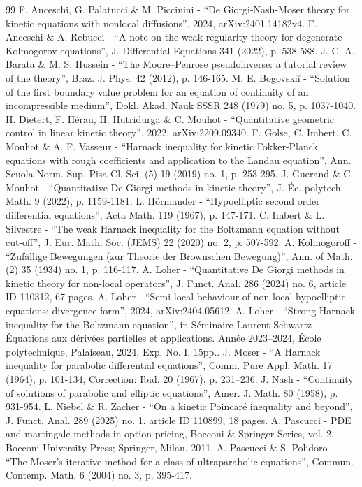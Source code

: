 \documentclass[10pt]{amsart}
\theoremstyle{definition}
\begin{document}
\begin{thebibliography}{99}
 F. Anceschi, G. Palatucci \& M. Piccinini - “De Giorgi-Nash-Moser theory for kinetic equations with nonlocal diffusions”, 2024, arXiv:2401.14182v4.
 F. Anceschi \& A. Rebucci - “A note on the weak regularity theory for degenerate Kolmogorov equations”, J. Differential Equations 341 (2022), p. 538-588.
 J. C. A. Barata \& M. S. Hussein - “The Moore–Penrose pseudoinverse: a tutorial review of the theory”, Braz. J. Phys. 42 (2012), p. 146-165.
 M. E. Bogovskiĭ - “Solution of the first boundary value problem for an equation of continuity of an incompressible medium”, Dokl. Akad. Nauk SSSR 248 (1979) no. 5, p. 1037-1040.
 H. Dietert, F. Hérau, H. Hutridurga \& C. Mouhot - “Quantitative geometric control in linear kinetic theory”, 2022, arXiv:2209.09340.
 F. Golse, C. Imbert, C. Mouhot \& A. F. Vasseur - “Harnack inequality for kinetic Fokker-Planck equations with rough coefficients and application to the Landau equation”, Ann. Scuola Norm. Sup. Pisa Cl. Sci. (5) 19 (2019) no. 1, p. 253-295.
 J. Guerand \& C. Mouhot - “Quantitative De Giorgi methods in kinetic theory”, J. Éc. polytech. Math. 9 (2022), p. 1159-1181.
 L. Hörmander - “Hypoelliptic second order differential equations”, Acta Math. 119 (1967), p. 147-171.
 C. Imbert \& L. Silvestre - “The weak Harnack inequality for the Boltzmann equation without cut-off”, J. Eur. Math. Soc. (JEMS) 22 (2020) no. 2, p. 507-592.
 A. Kolmogoroff - “Zufällige Bewegungen (zur Theorie der Brownschen Bewegung)”, Ann. of Math. (2) 35 (1934) no. 1, p. 116-117.
 A. Loher - “Quantitative De Giorgi methods in kinetic theory for non-local operators”, J. Funct. Anal. 286 (2024) no. 6, article ID 110312, 67 pages.
 A. Loher - “Semi-local behaviour of non-local hypoelliptic equations: divergence form”, 2024, arXiv:2404.05612.
 A. Loher - “Strong Harnack inequality for the Boltzmann equation”, in Séminaire Laurent Schwartz—Équations aux dérivées partielles et applications. Année 2023–2024, École polytechnique, Palaiseau, 2024, Exp. No. I, 15pp..
 J. Moser - “A Harnack inequality for parabolic differential equations”, Comm. Pure Appl. Math. 17 (1964), p. 101-134, Correction: Ibid. 20 (1967), p. 231–236.
 J. Nash - “Continuity of solutions of parabolic and elliptic equations”, Amer. J. Math. 80 (1958), p. 931-954.
 L. Niebel \& R. Zacher - “On a kinetic Poincaré inequality and beyond”, J. Funct. Anal. 289 (2025) no. 1, article ID 110899, 18 pages.
 A. Pascucci - PDE and martingale methods in option pricing, Bocconi \& Springer Series, vol. 2, Bocconi University Press; Springer, Milan, 2011.
 A. Pascucci \& S. Polidoro - “The Moser’s iterative method for a class of ultraparabolic equations”, Commun. Contemp. Math. 6 (2004) no. 3, p. 395-417.
\end{thebibliography}
\end{document}
